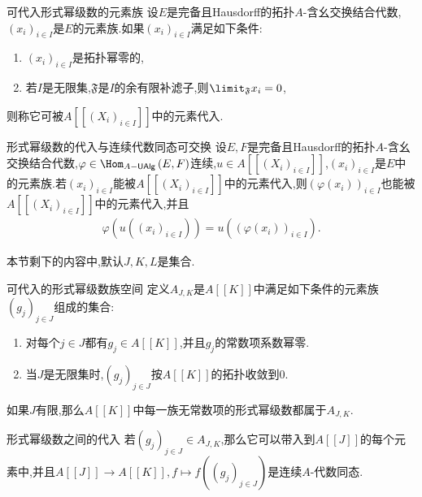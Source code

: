 \begin{definition}{可代入形式幂级数的元素族}{}
	设$E$是完备且Hausdorff的拓扑$A$-含幺交换结合代数,$\left(x_{i}\right)_{i\in I}$是$E$的元素族.如果$\left(x_{i}\right)_{i\in I}$满足如下条件:
	\begin{enumerate}
		\item $\left(x_{i}\right)_{i\in I}$是拓扑幂零的,
		\item 若$I$是无限集,$\mathfrak{F}$是$I$的余有限补滤子,则$\limit_{\mathfrak{F}}x_{i}=0$,
	\end{enumerate}
	则称它可被$A[[(X_{i})_{i\in I}]]$中的元素代入.
\end{definition}

\begin{proposition}{形式幂级数的代入与连续代数同态可交换}{}
	设$E,F$是完备且Hausdorff的拓扑$A$-含幺交换结合代数,$\varphi\in\Hom_{A-\mathsf{UAlg}}\left(E,F\right)$连续,$u\in A[[(X_{i})_{i\in I}]]$,$\left(x_{i}\right)_{i\in I}$是$E$中的元素族.若$\left(x_{i}\right)_{i\in I}$能被$A[[(X_{i})_{i\in I}]]$中的元素代入,则$\left(\varphi\left(x_{i}\right)\right)_{i\in I}$也能被$A[[(X_{i})_{i\in I}]]$中的元素代入,并且
	\begin{align*}
		\varphi\left(u\left(\left(x_{i}\right)_{i\in I}\right)\right)=u\left(\left(\varphi\left(x_{i}\right)\right)_{i\in I}\right).
	\end{align*}
\end{proposition}

本节剩下的内容中,默认$J,K,L$是集合.

\begin{definition}{可代入的形式幂级数族空间}{}
	定义$A_{J,K}$是$A[[K]]$中满足如下条件的元素族$\left(g_{j}\right)_{j\in J}$组成的集合:
	\begin{enumerate}
		\item 对每个$j\in J$都有$g_{j}\in A[[K]]$,并且$g_{j}$的常数项系数幂零.
		\item 当$J$是无限集时,$\left(g_{j}\right)_{j\in J}$按$A[[K]]$的拓扑收敛到$0$.
	\end{enumerate}
\end{definition}

\begin{remark}{}{}
	如果$J$有限,那么$A[[K]]$中每一族无常数项的形式幂级数都属于$A_{J,K}$.
\end{remark}

\begin{proposition}{形式幂级数之间的代入}{}
	若$\left(g_{j}\right)_{j\in J}\in A_{J,K}$,那么它可以带入到$A[[J]]$的每个元素中,并且$A[[J]]\to A[[K]],f\mapsto f\left(\left(g_{j}\right)_{j\in J}\right)$是连续$A$-代数同态.
\end{proposition}

